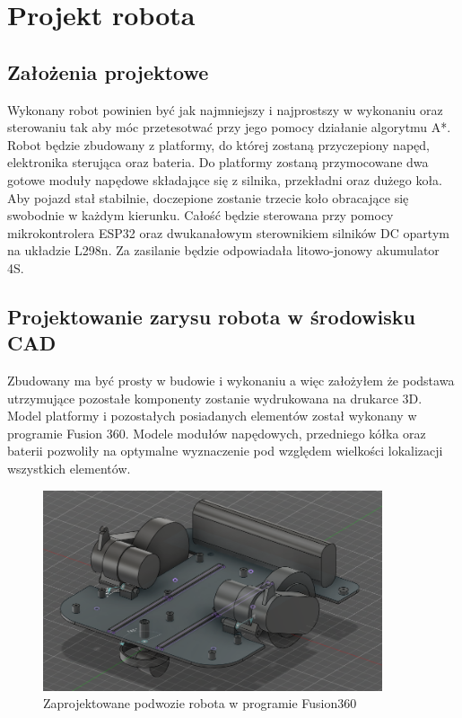 \section{Projekt robota}
\subsection{Założenia projektowe}
Wykonany robot powinien być jak najmniejszy i najprostszy w wykonaniu oraz sterowaniu tak aby móc przetesotwać przy jego pomocy działanie algorytmu A*. 
Robot będzie zbudowany z platformy, do której zostaną przyczepiony napęd, elektronika sterująca oraz bateria. 
Do platformy zostaną przymocowane dwa gotowe moduły napędowe składające się z silnika, przekładni oraz dużego koła. 
Aby pojazd stał stabilnie, doczepione zostanie trzecie koło obracające się swobodnie w każdym kierunku.
Całość będzie sterowana przy pomocy mikrokontrolera ESP32 oraz dwukanałowym sterownikiem silników DC opartym na układzie L298n.
Za zasilanie będzie odpowiadała litowo-jonowy akumulator 4S.

\subsection{Projektowanie zarysu robota w środowisku CAD}
Zbudowany ma być prosty w budowie i wykonaniu a więc założyłem że podstawa utrzymujące pozostałe komponenty
zostanie wydrukowana na drukarce 3D. Model platformy i pozostałych posiadanych elementów został wykonany w programie Fusion 360.
Modele modułów napędowych, przedniego kółka oraz baterii pozwoliły na optymalne wyznaczenie pod względem wielkości lokalizacji wszystkich elementów.

\begin{figure}[H]
	\centering
	\includegraphics[width=10cm]{pages/robot/zdjecia/robotModelCaly.png}
	\caption{Zaprojektowane podwozie robota w programie Fusion360}
	\label{fig:Rys}
\end{figure}

